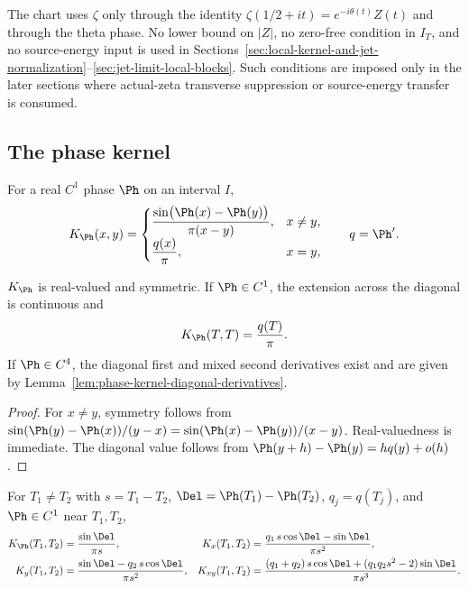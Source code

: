 \begin{remark}
\label{rem:chart-regularity-zeta-side}
The chart uses \(\zeta\) only through the identity
\(\zeta(1/2+it)=e^{-i\theta(t)}Z(t)\) and through the theta phase.
No lower bound on \(|Z|\), no zero-free condition in \(I_T\), and no
source-energy input is used in
Sections~\ref{sec:local-kernel-and-jet-normalization}--\ref{sec:jet-limit-local-blocks}.
Such conditions are imposed only in the later sections where
actual-zeta transverse suppression or source-energy transfer is
consumed.
\end{remark}

\subsection{The phase kernel}
\label{subsec:phase-kernel}

\begin{definition}
\label{def:phase-kernel}
For a real \(C^1\) phase \(\Ph\) on an interval \(I\),
\begin{equation}
\label{eq:phase-kernel}
K_\Ph(x,y)=
\begin{cases}
\dfrac{\sin\bigl(\Ph(x)-\Ph(y)\bigr)}{\pi(x-y)}, & x\ne y,\\[1.2ex]
\dfrac{q(x)}{\pi}, & x=y,
\end{cases}
\qquad q=\Ph'.
\end{equation}
\end{definition}

\begin{lemma}
\label{lem:phase-kernel-properties}
\(K_\Ph\) is real-valued and symmetric.  If \(\Ph\in C^1\), the
extension across the diagonal is continuous and
\[
        K_\Ph(T,T)=\frac{q(T)}{\pi}.
\]
If \(\Ph\in C^4\), the diagonal first and mixed second derivatives
exist and are given by
Lemma~\ref{lem:phase-kernel-diagonal-derivatives}.
\end{lemma}

\begin{proof}
For \(x\ne y\), symmetry follows from
\(\sin(\Ph(y)-\Ph(x))/(y-x) = \sin(\Ph(x)-\Ph(y))/(x-y)\).
Real-valuedness is immediate.  The diagonal value follows from
\(\Ph(y+h)-\Ph(y) = h q(y) + o(h)\).
\end{proof}

\begin{lemma}
\label{lem:phase-kernel-derivatives}
For \(T_1\ne T_2\) with \(s=T_1-T_2\), \(\Del=\Ph(T_1)-\Ph(T_2)\),
\(q_j=q(T_j)\), and \(\Ph\in C^1\) near \(T_1, T_2\),
\begin{align*}
K_\Ph(T_1,T_2) &= \frac{\sin\Del}{\pi s},
&K_x(T_1,T_2) &= \frac{q_1\,s\cos\Del - \sin\Del}{\pi s^2},\\
K_y(T_1,T_2) &= \frac{\sin\Del - q_2\,s\cos\Del}{\pi s^2},
&K_{xy}(T_1,T_2)
&= \frac{(q_1+q_2)\,s\cos\Del + (q_1 q_2 s^2 - 2)\sin\Del}{\pi s^3}.
\end{align*}
\end{lemma}

